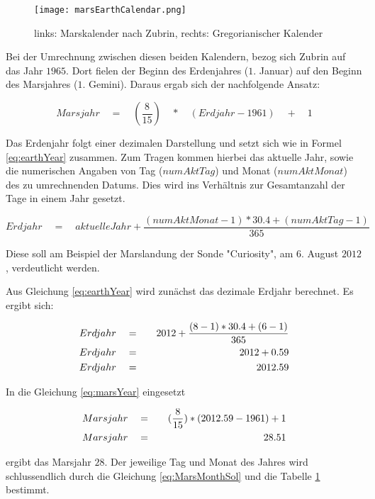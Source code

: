 \begin{figure}[H]
	\centering
	\texttt{[image: marsEarthCalendar.png]}
	\label{fig:marsEarthCalendar}
	\caption{links: Marskalender nach Zubrin, rechts: Gregorianischer Kalender}
\end{figure}

Bei der Umrechnung zwischen diesen beiden Kalendern, bezog sich Zubrin auf das
Jahr $1965$. Dort fielen der Beginn des Erdenjahres ($1.$ Januar) auf den
Beginn des Marsjahres ($1.$ Gemini). Daraus ergab sich der nachfolgende Ansatz:

\begin{equation}
	Marsjahr \quad = \quad (\frac{8}{15}) \quad * \quad (Erdjahr - 1961) \quad + \quad 1
	\label{eq:marsYear}
\end{equation}

Das Erdenjahr folgt einer dezimalen Darstellung und setzt sich wie in Formel
\ref{eq:earthYear} zusammen. Zum Tragen kommen hierbei das aktuelle Jahr, sowie
die numerischen Angaben von Tag ($numAktTag$) und Monat ($numAktMonat$) des zu
umrechnenden Datums. Dies wird ins Verhältnis zur Gesamtanzahl der Tage in einem
Jahr gesetzt.

\begin{equation}
	Erdjahr \quad = \quad aktuelleJahr + \frac{ (numAktMonat - 1) * 30.4 + (numAktTag - 1) }{365}
	\label{eq:earthYear}
\end{equation}

Diese soll am Beispiel der Marslandung der Sonde "Curiosity", am $6.$ August
$2012$, verdeutlicht werden.

Aus Gleichung \ref{eq:earthYear} wird zunächst das dezimale Erdjahr berechnet.
Es ergibt sich:

\begin{eqnarray}
	Erdjahr \quad & = & \quad 2012 + \frac{ (8-1) * 30.4 + (6-1) }{365} \notag\\
	Erdjahr \quad & = & \quad 2012 + 0.59 \notag\\
	Erdjahr \quad & = & \quad 2012.59
\end{eqnarray}

In die Gleichung \ref{eq:marsYear} eingesetzt

\begin{eqnarray}
	Marsjahr \quad & = & \quad (\frac{8}{15}) * (2012.59 - 1961) + 1 \notag\\
	Marsjahr \quad & = & \quad 28.51
\end{eqnarray}

ergibt das Marsjahr $28$. Der jeweilige Tag und Monat des Jahres wird
schlussendlich durch die Gleichung \ref{eq:MarsMonthSol} und die Tabelle
\ref{fig:marsEarthCalendar} bestimmt.

